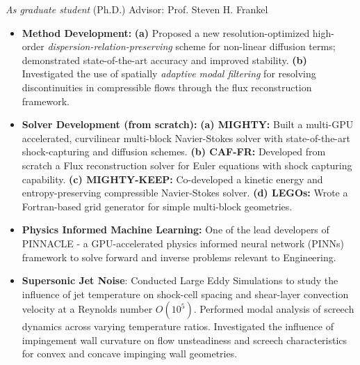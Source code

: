 \noindent \textit{As graduate student} (Ph.D.) \hfill Advisor: Prof. Steven H. Frankel \\[-5mm]
\begin{itemize}[itemsep=0pt, topsep=5pt, label=]
    \item \textbf{Method Development:} \textbf{(a)} Proposed a new resolution-optimized high-order \textit{dispersion-relation-preserving} scheme for non-linear diffusion terms; demonstrated state-of-the-art accuracy and improved stability. \textbf{(b)} Investigated the use of spatially \textit{adaptive modal filtering} for resolving discontinuities in compressible flows through the flux reconstruction framework.
\end{itemize}
\begin{itemize}[itemsep=0pt, topsep=0pt, label=]
    \item \textbf{Solver Development (from scratch):}  
    \textbf{(a) MIGHTY:} Built a multi-GPU accelerated, curvilinear multi-block Navier-Stokes solver with state-of-the-art shock-capturing and diffusion schemes.  
    \textbf{(b) CAF-FR:} Developed from scratch a Flux reconstruction solver for Euler equations with shock capturing capability.  
    \textbf{(c) MIGHTY-KEEP:} Co-developed a kinetic energy and entropy-preserving compressible Navier-Stokes solver.  
    \textbf{(d) LEGOs:} Wrote a Fortran-based grid generator for simple multi-block geometries.  
\end{itemize}
\begin{itemize}[itemsep=0pt, topsep=0pt, label=]
    \item \textbf{Physics Informed Machine Learning:} One of the lead developers of PINNACLE - a GPU-accelerated physics informed neural network (PINNs) framework to solve forward and inverse problems relevant to Engineering.
\end{itemize}
\begin{itemize}[itemsep=0pt, topsep=0pt, label=]
    \item \textbf{Supersonic Jet Noise}: Conducted Large Eddy Simulations to study the influence of jet temperature on shock-cell spacing and shear-layer convection velocity at a Reynolds number \( O(10^5) \). Performed modal analysis of screech dynamics across varying temperature ratios. Investigated the influence of impingement wall curvature on flow unsteadiness and screech characteristics for convex and concave impinging wall geometries.  \\ 
\end{itemize}


